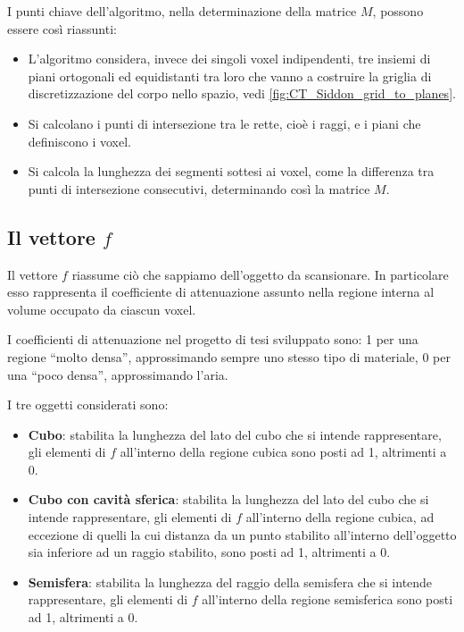 \documentclass[12pt,a4paper]{report}
\begin{document}
I punti chiave dell'algoritmo, nella determinazione della matrice \(M\), possono essere così riassunti:
\begin{itemize}
  \item L'algoritmo considera, invece dei singoli voxel indipendenti, tre insiemi di piani ortogonali ed equidistanti tra loro che
        vanno a costruire la griglia di discretizzazione del corpo nello spazio, vedi \autoref{fig:CT_Siddon_grid_to_planes}.
  \item Si calcolano i punti di intersezione tra le rette, cioè i raggi, e i piani che definiscono i voxel.
  \item Si calcola la lunghezza dei segmenti sottesi ai voxel, come la differenza tra punti di intersezione consecutivi,
        determinando così la matrice \(M\).
\end{itemize}

\subsection{Il vettore \texorpdfstring{\(f\)}{f}} \label{subsec:vector_f}

Il vettore \(f\) riassume ciò che sappiamo dell'oggetto da scansionare.
In particolare esso rappresenta il coefficiente di attenuazione assunto nella regione interna al volume occupato da ciascun voxel.

I coefficienti di attenuazione nel progetto di tesi sviluppato sono: 1 per una regione ``molto densa'', approssimando sempre uno
stesso tipo di materiale, 0 per una ``poco densa'', approssimando l'aria.

I tre oggetti considerati sono:
\begin{itemize}
  \item \textbf{Cubo}: stabilita la lunghezza del lato del cubo che si intende rappresentare, gli elementi di \(f\) all'interno
        della regione cubica sono posti ad 1, altrimenti a 0.
  \item \textbf{Cubo con cavità sferica}: stabilita la lunghezza del lato del cubo che si intende rappresentare, gli elementi
        di \(f\) all'interno della regione cubica, ad eccezione di quelli la cui distanza da un punto stabilito all'interno
        dell'oggetto sia inferiore ad un raggio stabilito, sono posti ad 1, altrimenti a 0.
  \item \textbf{Semisfera}: stabilita la lunghezza del raggio della semisfera che si intende rappresentare, gli elementi di
        \(f\) all'interno della regione semisferica sono posti ad 1, altrimenti a 0.
\end{itemize}
\end{document}

